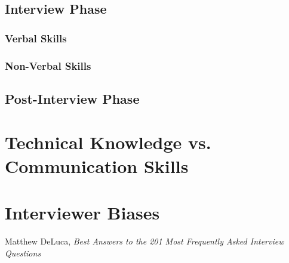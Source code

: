 \documentclass[a4paper,12pt]{report}
\begin{document}
\section{Interview Phase}
\subsection{Verbal Skills}
\subsection{Non-Verbal Skills}
\section{Post-Interview Phase}
\appendix
\chapter{Technical Knowledge vs. Communication Skills}
\chapter{Interviewer Biases}
\begin{thebibliography}{9}
  Matthew DeLuca,
  \emph{Best Answers to the 201 Most Frequently Asked Interview Questions}
\end{thebibliography}
\end{document}
